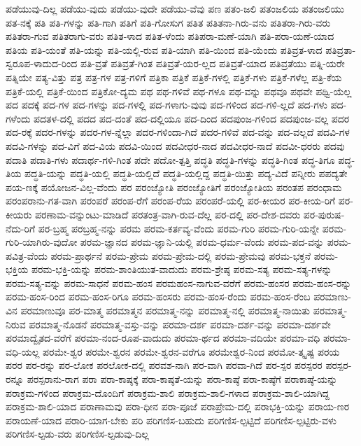 {ಪಡೆಯುವು-ದಿಲ್ಲ
ಪಡೆಯು-ವುದು
ಪಡೆಯು-ವುದೇ
ಪಡೆಯು-ವೆವು
ಪಣ
ಪತಂ-ಜಲಿ
ಪತಂಜಲಿಯ
ಪತಂಜಲಿಯು
ಪತ-ನಕ್ಕೆ
ಪತಿ
ಪತಿ-ಗಳನ್ನು
ಪತಿ-ಗಾಗಿ
ಪತಿಗೆ
ಪತಿ-ಗೋಸುಗ
ಪತಿತ
ಪತಿತನಾ-ಗಿರು-ವನು
ಪತಿತರಾ-ಗಿರು-ವರು
ಪತಿತರಾ-ಗುವ
ಪತಿತರಾಗು-ವರು
ಪತಿತ-ಳಾದ
ಪತಿತ-ಳೆಂದು
ಪತಿಪರಾ-ಮಣೆ-ಯಾಗಿ
ಪತಿ-ಪರಾ-ಯಣೆ-ಯಾದ
ಪತಿಯ
ಪತಿ-ಯಂತೆ
ಪತಿ-ಯನ್ನು
ಪತಿ-ಯಲ್ಲಿ-ರುವ
ಪತಿ-ಯಾಗಿ
ಪತಿ-ಯಿಂದ
ಪತಿ-ಯೆಂದು
ಪತಿವ್ರತ-ಳಾದ
ಪತಿವ್ರತಾ-ಸ್ವರೂಪ-ಳಾದುದ-ರಿಂದ
ಪತಿ-ವ್ರತೆ
ಪತಿವ್ರತೆ-ಗಿಂತ
ಪತಿವ್ರತೆ-ಯರ-ಲ್ಲದ
ಪತಿವ್ರತೆ-ಯಾದ
ಪತಿವ್ರತೆಯು
ಪತ್ನಿ-ಯರೇ
ಪತ್ನಿಯೇ
ಪತ್ಯ-ವಿತ್ತು
ಪತ್ರ
ಪತ್ರ-ಗಳ
ಪತ್ರ-ಗಳಿಗೆ
ಪತ್ರಿಕಾ
ಪತ್ರಿಕೆ
ಪತ್ರಿಕೆ-ಗಳಲ್ಲಿ
ಪತ್ರಿಕೆ-ಗಳು
ಪತ್ರಿಕೆ-ಗಳೆಲ್ಲ
ಪತ್ರಿ-ಕೆಯ
ಪತ್ರಿಕೆ-ಯಲ್ಲಿ
ಪತ್ರಿಕೆ-ಯಿಂದ
ಪತ್ರಿಕೋ-ದ್ಯಮ
ಪಥ
ಪಥ-ಗಳಿವೆ
ಪಥ-ಗಳೂ
ಪಥ-ವನ್ನು
ಪಥವೂ
ಪಥವೇ
ಪಥ್ವಿ-ಯೆಲ್ಲ
ಪದ
ಪದಕ್ಕೆ
ಪದ-ಗಳ
ಪದ-ಗಳನ್ನು
ಪದ-ಗಳಲ್ಲಿ
ಪದ-ಗಳಾಗು-ವುವು
ಪದ-ಗಳಿಂದ
ಪದ-ಗಳಿ-ಲ್ಲದೆ
ಪದ-ಗಳು
ಪದ-ಗಳೆಂದು
ಪದತಳ-ದಲ್ಲಿ
ಪದದ
ಪದ-ದಂತೆ
ಪದ-ದಲ್ಲಿಯೂ
ಪದ-ದಿಂದ
ಪದಪುಂಜ-ಗಳಿಂದ
ಪದಪುಂಜ-ವಲ್ಲ
ಪದರ
ಪದ-ರಕ್ಕೆ
ಪದರ-ಗಳನ್ನು
ಪದರ-ಗಳ-ನ್ನೆಲ್ಲಾ
ಪದರ-ಗಳಿಂದಾ-ಗಿದೆ
ಪದರ-ಗಳಿವೆ
ಪದ-ವನ್ನು
ಪದ-ವಲ್ಲದೆ
ಪದವಿ-ಗಳ
ಪದವಿ-ಗಳನ್ನು
ಪದ-ವಿಗೆ
ಪದ-ವಿಯ
ಪದವಿ-ಯಿಂದ
ಪದವೀಧರ-ನಾದ
ಪದವೀಧರ-ನಾದೆ
ಪದವೀ-ಧರರು
ಪದವು
ಪದಾತಿ
ಪದಾತಿ-ಗಳು
ಪದಾರ್ಥ-ಗಳಿ-ಗಿಂತ
ಪದೇ
ಪದೋ-ತ್ಪತ್ತಿ
ಪದ್ಧತಿ
ಪದ್ಧತಿ-ಗಳನ್ನು
ಪದ್ಧತಿ-ಗಿಂತ
ಪದ್ಧ-ತಿಗೂ
ಪದ್ಧ-ತಿಯ
ಪದ್ಧತಿ-ಯನ್ನು
ಪದ್ಧತಿ-ಯಲ್ಲಿ
ಪದ್ಧತಿ-ಯಲ್ಲಿದೆ
ಪದ್ಧತಿ-ಯಲ್ಲಿದ್ದ
ಪದ್ಧತಿ-ಯಿತ್ತು
ಪದ್ಯ-ವಿದೆ
ಪನ್ನೀರು
ಪಪದ್ಯತೇ
ಪಯ-ಣಕ್ಕೆ
ಪಯೋಜನ-ವಿಲ್ಲ-ವೆಂದು
ಪರ
ಪರಂಜ್ಯೋತಿ
ಪರಂಜ್ಯೋತಿಗೆ
ಪರಂಜ್ಯೋತಿಯ
ಪರಂತಪ
ಪರಂಧಾಮ
ಪರಂಪರಾನು-ಗತ-ವಾಗಿ
ಪರಂಪರೆ
ಪರಂಪ-ರೆಗೆ
ಪರಂಪ-ರೆಯ
ಪರಂಪರೆ-ಯಲ್ಲಿ
ಪರ-ಕೀಯರ
ಪರ-ಕೀಯ-ರಿಗೆ
ಪರ-ಕೀಯರು
ಪರಣಾಮ-ವನ್ನುಂಟು-ಮಾಡಿದೆ
ಪರತಂತ್ರ-ವಾಗಿ-ರುವ-ದೆಲ್ಲ
ಪರ-ದಲ್ಲಿ
ಪರ-ದೇಶ-ದವರು
ಪರ-ಪುರುಷ-ನೆದು-ರಿಗೆ
ಪರ-ಬ್ರಹ್ಮ
ಪರಬ್ರಹ್ಮ-ನನ್ನು
ಪರಮ
ಪರಮ-ಕರ್ತವ್ಯ-ವೆಂದು
ಪರಮ-ಗುರಿ
ಪರಮ-ಗುರಿ-ಯನ್ನೇ
ಪರಮ-ಗುರಿ-ಯಾಗಿರು-ವುದೋ
ಪರಮ-ಜ್ಞಾನದ
ಪರಮ-ಜ್ಞಾನಿ-ಯಲ್ಲಿ
ಪರಮ-ಧರ್ಮ-ವೆಂದು
ಪರಮ-ಪದ-ವನ್ನು
ಪರಮ-ಪವಿತ್ರ-ವೆಂದು
ಪರಮ-ಪ್ರಾರ್ಥನೆ
ಪರಮ-ಪ್ರೇಮ
ಪರಮ-ಪ್ರೇಮ-ದಲ್ಲಿ
ಪರಮ-ಪ್ರೇಮವು
ಪರಮ-ಭಕ್ತನೆ
ಪರಮ-ಭಕ್ತಿಯ
ಪರಮ-ಭಕ್ತಿ-ಯನ್ನು
ಪರಮ-ಶಾಂತಿಯುತ-ವಾದುದು
ಪರಮ-ಶ್ರೇಷ್ಠ
ಪರಮ-ಸತ್ಯ
ಪರಮ-ಸತ್ಯ-ಗಳನ್ನು
ಪರಮ-ಸತ್ಯ-ವನ್ನು
ಪರಮ-ಸಾಧನೆ
ಪರಮ-ಹಂಸ
ಪರಮಹಂಸ-ನಾಗುವ-ವರೆಗೆ
ಪರಮ-ಹಂಸರ
ಪರಮ-ಹಂಸ-ರನ್ನು
ಪರಮ-ಹಂಸ-ರಿಂದ
ಪರಮ-ಹಂಸ-ರಿಗೂ
ಪರಮ-ಹಂಸರು
ಪರಮ-ಹಂಸ-ರೆಂದು
ಪರಮ-ಹಂಸ-ರೆಂಬ
ಪರಮಾಣು-ವಿನ
ಪರಮಾಣುವೂ
ಪರ-ಮಾತ್ಮ
ಪರಮಾತ್ಮನ
ಪರಮಾತ್ಮ-ನನ್ನು
ಪರಮಾತ್ಮ-ನಲ್ಲಿ
ಪರಮಾತ್ಮ-ನಾಯಿತು
ಪರಮಾತ್ಮ-ನಿರುವ
ಪರಮಾತ್ಮ-ನೊಡನೆ
ಪರಮಾತ್ಮ-ವಸ್ತು-ವನ್ನು
ಪರಮಾ-ದರ್ಶ
ಪರಮಾ-ದರ್ಶ-ವನ್ನು
ಪರಮಾ-ದರ್ಶವೇ
ಪರಮಾದ್ವೈತದ-ವರೆಗೆ
ಪರಮಾ-ನಂದ-ರೂಪ-ವಾದುದು
ಪರಮಾ-ರ್ಥದ
ಪರಮಾ-ವದಿಯೇ
ಪರಮಾ-ವಧಿ
ಪರಮಾ-ವಧಿ-ಯಲ್ಲ
ಪರಮೇ-ಶ್ವರ
ಪರಮೇ-ಶ್ವರನ
ಪರಮೇ-ಶ್ವರನ-ವರೆಗೂ
ಪರಮೇಶ್ವರ-ನಿಂದ
ಪರಮೋ-ತ್ಕೃಷ್ಟ
ಪರಯ
ಪರರ
ಪರ-ರನ್ನು
ಪರ-ಲೋಕ
ಪರಲೋಕ-ದಲ್ಲಿ
ಪರವಶ-ನಾಗಿ
ಪರ-ವಾಗಿ
ಪರವಾ-ಗಿದೆ
ಪರ-ಸ್ಪರ
ಪರಸ್ಪರರ
ಪರಸ್ಪರ-ರನ್ನೂ
ಪರಸ್ಪರಾನು-ರಾಗ
ಪರಾ
ಪರಾ-ಕಾಷ್ಠಕ್ಕೆ
ಪರಾ-ಕಾಷ್ಠತೆ-ಯನ್ನು
ಪರಾ-ಕಾಷ್ಠೆ
ಪರಾ-ಕಾಷ್ಠೆಗೆ
ಪರಾಕಾಷ್ಠೆ-ಯನ್ನು
ಪರಾಕ್ರಮ-ಗಳಿಂದ
ಪರಾಕ್ರಮ-ದೊಂದಿಗೆ
ಪರಾಕ್ರಮ-ಶಾಲಿ
ಪರಾಕ್ರಮ-ಶಾಲಿ-ಗಳಾದ
ಪರಾಕ್ರಮ-ಶಾಲಿ-ಯಾಗಿದ್ದ
ಪರಾಕ್ರಮ-ಶಾಲಿ-ಯಾದ
ಪರಾಣಾಮವು
ಪರಾ-ಧೀನ
ಪರಾ-ಪೂಜೆ
ಪರಾಪ್ರೇಮ-ದಲ್ಲಿ
ಪರಾಭಕ್ತಿ-ಯನ್ನು
ಪರಾಯ-ಣರ
ಪರಾಯಣೆ-ಯಾದ
ಪರಾರಿ-ಯಾಗ-ಬೇಕು
ಪರಿ
ಪರಿಗಣಿಸ-ಬಹುದು
ಪರಿಗಣಿಸ-ಲ್ಪಟ್ಟಿದೆ
ಪರಿಗಣಿಸ-ಲ್ಪಟ್ಟಿರು-ವಳು
ಪರಿಗಣಿಸ-ಲ್ಪಡು-ವರು
ಪರಿಗಣಿಸ-ಲ್ಪಡುವು-ದಿಲ್ಲ
}
